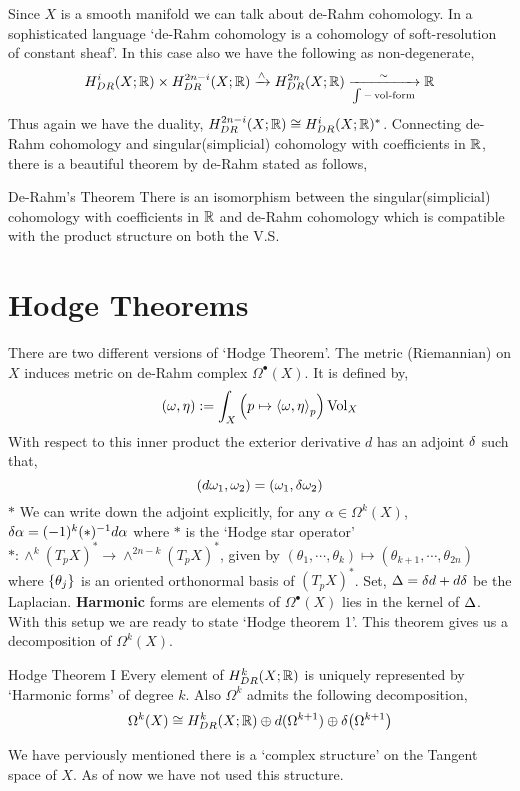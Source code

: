 \documentclass[11pt]{article}
\begin{document}
\noindent Since $X$ is a smooth manifold we can talk about de-Rahm cohomology. In a sophisticated language `de-Rahm cohomology is a cohomology of soft-resolution of constant sheaf'. In this case also we have the following as non-degenerate, 
\[H^{i}_{DR}(X;\mathbb{R}) \times H^{2n-i}_{DR}(X;\mathbb{R}) \xrightarrow{\wedge} H^{2n}_{DR}(X;\mathbb{R}) \xrightarrow[\int - \operatorname{vol-form}]{\sim} \mathbb{R}\]
Thus again we have the duality, $H^{2n-i}_{DR}(X;\mathbb{R}) \cong H^{i}_{DR}(X;\mathbb{R})^*$. Connecting de-Rahm cohomology and singular(simplicial) cohomology with coefficients in $\mathbb{R}$, there is a beautiful theorem by de-Rahm stated as follows, 

\begin{Thm}{De-Rahm's Theorem}{}
     There is an isomorphism between the singular(simplicial) cohomology with coefficients in $\mathbb{R}$ and de-Rahm cohomology which is compatible with the product structure on both the V.S. 
\end{Thm}

\section{Hodge Theorems}

There are two different versions of `Hodge Theorem'. The metric (Riemannian) on $X$ induces metric on de-Rahm complex $\Omega^{\bullet}(X)$. It is defined by, $$(\omega,\eta) := \int_{X} \qty(p \mapsto \left\langle {\omega}, {\eta} \right\rangle_p) \operatorname{Vol}_X$$
With respect to this inner product the exterior derivative $d$ has an adjoint $\delta$ such that, $$(d\omega_1,\omega_2)=(\omega_1,\delta \omega_2)$$
$\ast$ We can write down the adjoint explicitly, for any $\alpha \in \Omega^k(X)$, $\delta \alpha = (-1)^k (\ast)^{-1} d\alpha$ where $\ast$ is the `Hodge star operator' $\ast : \wedge^k (T_pX)^{\ast} \to \wedge^{2n-k} (T_pX)^{\ast}$, given by $(\theta_1,\cdots,\theta_k)\mapsto (\theta_{k+1},\cdots,\theta_{2n})$ where $\qty{\theta_j}$ is an oriented orthonormal basis of $(T_pX)^{\ast}$.  Set, $\Delta = \delta d + d \delta$ be the Laplacian. \textbf{Harmonic} forms are elements of $\Omega^{\bullet}(X)$ lies in the kernel of $\Delta$. With this setup we are ready to state `Hodge theorem 1'. This theorem gives us a decomposition of $\Omega^{k}(X)$. 

\begin{Thm}{Hodge Theorem I}{}
   Every element of $H^k_{DR}(X;\mathbb{R})$ is uniquely represented by `Harmonic forms' of degree $k$. Also $\Omega^k$ admits the following decomposition, 
   \[\Omega^k(X)\cong H^k_{DR}(X;\mathbb{R})\oplus d(\Omega^{k+1})\oplus \delta \qty(\Omega^{k+1})\]
\end{Thm}
\noindent We have perviously mentioned there is a `complex structure' on the Tangent space of $X$. As of now we have not used this structure. \newcommand{\om}{\mathbf{\Omega}}
\end{document}
